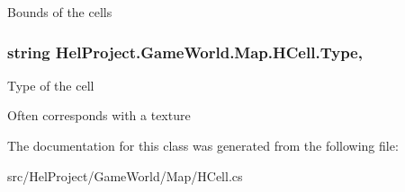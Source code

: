 Bounds of the cells 

\hypertarget{class_hel_project_1_1_game_world_1_1_map_1_1_h_cell_a5565694259c3692972bea83e774a1012}{}
\subsubsection[{Type}]{\setlength{\rightskip}{0pt plus 5cm}string Hel\+Project.\+Game\+World.\+Map.\+H\+Cell.\+Type\hspace{0.3cm}{\ttfamily [get]}, {\ttfamily [set]}}\label{class_hel_project_1_1_game_world_1_1_map_1_1_h_cell_a5565694259c3692972bea83e774a1012}


Type of the cell 

Often corresponds with a texture 

The documentation for this class was generated from the following file\+:\begin{DoxyCompactItemize}
\item 
src/\+Hel\+Project/\+Game\+World/\+Map/H\+Cell.\+cs\end{DoxyCompactItemize}
